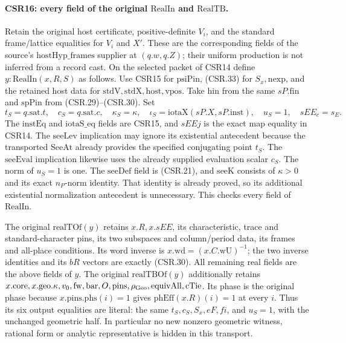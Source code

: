 \paragraph{CSR16: every field of the original \(\mathrm{RealIn}\) and \(\mathrm{RealTB}\).}
\label{claim:CSR16}
Retain the original host certificate, positive-definite \(V_i\),
and the standard frame/lattice equalities for \(V_i\) and \(X'\).
These are the corresponding fields of the source's
\(\mathrm{hostHyp\_frames}\) supplier at \((q.w,q.Z)\);
their uniform production is not inferred from a record cast.
On the selected packet of CSR14 define \(y:\mathrm{RealIn}(x,R,S)\)
as follows. Use CSR15 for \(\mathrm{psiPin}\), (CSR.33) for
\(S_x,\mathrm{nexp}\), and the retained host data for
\(\mathrm{stdV,stdX,host,vpos}\).
Take \(\mathrm{hin}\) from the same \(sP.\mathrm{fin}\) and
\(\mathrm{spPin}\) from (CSR.29)--(CSR.30). Set
\[
 t_S=q.\mathrm{sat}.t,\quad c_S=q.\mathrm{sat}.c,\quad
 \kappa_S=\kappa,\quad
 \iota_S=\mathrm{iotaX}(sP.X,sP.\mathrm{inst}),\quad
 u_S=1,\quad sEE_c=s_E .
 \tag{CSR.34}
\]
The \(\mathrm{instEq}\) and \(\mathrm{iotaS\_eq}\) fields are
CSR15, and \(sEEj\) is the exact map equality in CSR14.
The \(\mathrm{seeLev}\) implication may ignore its existential
antecedent because the transported \(\mathrm{SeeAt}\) already
provides the specified conjugating point \(t_S\). The
\(\mathrm{seeEval}\) implication likewise uses the already
supplied evaluation scalar \(c_S\). The norm of \(u_S=1\) is one.
The \(\mathrm{seeDef}\) field is (CSR.21), and
\(\mathrm{seeK}\) consists of \(\kappa>0\) and its exact
\(n_P\)-norm identity. That identity is already proved, so its
additional existential normalization antecedent is unnecessary.
This checks every field of \(\mathrm{RealIn}\).

The original \(\mathrm{realTOf}(y)\) retains \(x.R,x.sEE\),
its characteristic, trace and standard-character pins, its two
subspaces and column/period data, its frames and all-place
conditions. Its word inverse is \(x.\mathrm{wd}=(x.C.\mathrm{wU})^{-1}\);
the two inverse identities and its \(bR\) vectors are exactly
(CSR.30). All remaining real fields are the above fields of \(y\).
The original \(\mathrm{realTBOf}(y)\) additionally retains
\(x.\mathrm{core},x.\mathrm{geo}.\kappa,v_0,\mathrm{fw},
\mathrm{bar},O,\mathrm{pins},\rho_{\rm Geo},\mathrm{equivAll},
\mathrm{cTie}\). Its phase is the original phase because
\(x.\mathrm{pins.phs}(i)=1\) gives
\(\mathrm{phEff}(x.R)(i)=1\) at every \(i\).
Thus its six output equalities are literal:
the same \(t_S,c_S,S_x,eF,fi\), and \(u_S=1\), with the
unchanged geometric half. In particular no new nonzero geometric
witness, rational form or analytic representative is hidden in
this transport.

